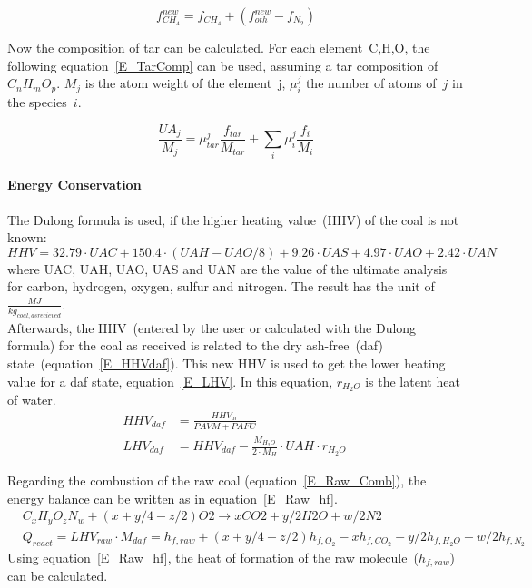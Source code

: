\begin{equation}
 f_{CH_4}^{new} = f_{CH_4} + \left( f_{oth}^{new} - f_{N_2} \right)
\label{E_MethanNew}
\end{equation}

Now the composition of tar can be calculated. For each element~C,H,O, the following equation~\ref{E_TarComp} can be used, assuming a tar composition of~$C_nH_mO_p$. $M_j$ is the atom weight of the element~j, $\mu_i^j$ the number of atoms of~$j$ in the species~$i$.

\begin{equation}
\frac{UA_j}{M_j} = \mu_{tar}^j \frac{f_{tar}}{M_{tar}} + \sum_i \mu_i^{j} \frac{f_{i}}{M_{i}}
\label{E_TarComp}
\end{equation}


\paragraph{Energy Conservation}
The Dulong formula is used, if the higher heating value~(HHV) of the coal is not known:
\begin{equation}\label{E_Dulong}
 HHV = 32.79 \cdot UAC + 150.4 \cdot (UAH - UAO/8) + 9.26 \cdot UAS + 4.97 \cdot UAO + 2.42 \cdot UAN
\end{equation}
where UAC, UAH, UAO, UAS and UAN are the value of the ultimate analysis for carbon, hydrogen, oxygen, sulfur and nitrogen. The result has the unit of~$\frac{MJ}{kg_{coal, as recieved}}$.\\

Afterwards, the HHV~(entered by the user or calculated with the Dulong formula) for the coal as received is related to the dry ash-free~(daf) state~(equation~\ref{E_HHVdaf}). This new HHV is used to get the lower heating value for a daf state, equation~\ref{E_LHV}. In this equation, $r_{H_2O}$ is the latent heat of water.
\begin{align}
 HHV_{daf}&=\frac{HHV_{ar}}{PAVM+PAFC}
\label{E_HHVdaf}\\
LHV_{daf}&=HHV_{daf}-\frac{M_{H_2O}}{2 \cdot M_H} \cdot UAH \cdot r_{H_2O}\
\label{E_LHV}
\end{align}

Regarding the combustion of the raw coal (equation~\ref{E_Raw_Comb}), the energy balance can be written as in equation~\ref{E_Raw_hf}.
\begin{align}
 &C_xH_y O_z N_w + (x + y/4 - z/2) O2 \rightarrow x CO2 + y/2 H2O + w/2 N2
\label{E_Raw_Comb}\\
&Q_{react}=LHV_{raw}\cdot M_{daf} = h_{f,raw} + (x + y/4 - z/2) h_{f,O_2} -x h_{f,CO_2} -y/2
	h_{f,H_2O} - w/2 h_{f,N_2}
\label{E_Raw_hf}
\end{align}
Using equation~\ref{E_Raw_hf}, the heat of formation of the raw molecule~($h_{f,raw}$) can be calculated.\\

